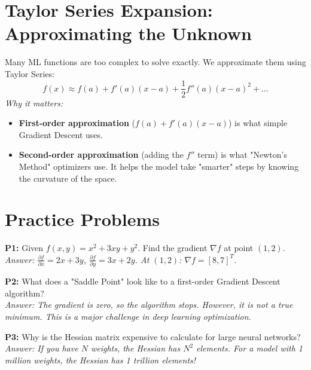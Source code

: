 \documentclass{article}
\begin{document}
\section{Taylor Series Expansion: Approximating the Unknown}
Many ML functions are too complex to solve exactly. We approximate them using Taylor Series:
\begin{equation}
    f(x) \approx f(a) + f'(a)(x-a) + \frac{1}{2}f''(a)(x-a)^2 + \dots
\end{equation}
\textit{Why it matters:} 
\begin{itemize}
    \item \textbf{First-order approximation} ($f(a) + f'(a)(x-a)$) is what simple Gradient Descent uses.
    \item \textbf{Second-order approximation} (adding the $f''$ term) is what "Newton's Method" optimizers use. It helps the model take "smarter" steps by knowing the curvature of the space.
\end{itemize}

\section{Practice Problems}
\textbf{P1:} Given $f(x, y) = x^2 + 3xy + y^2$. Find the gradient $\nabla f$ at point $(1, 2)$. \\
\textit{Answer: $\frac{\partial f}{\partial x} = 2x + 3y$, $\frac{\partial f}{\partial y} = 3x + 2y$. At $(1, 2)$: $\nabla f = [8, 7]^T$.}

\textbf{P2:} What does a "Saddle Point" look like to a first-order Gradient Descent algorithm? \\
\textit{Answer: The gradient is zero, so the algorithm stops. However, it is not a true minimum. This is a major challenge in deep learning optimization.}

\textbf{P3:} Why is the Hessian matrix expensive to calculate for large neural networks? \\
\textit{Answer: If you have $N$ weights, the Hessian has $N^2$ elements. For a model with 1 million weights, the Hessian has 1 trillion elements!}
\end{document}

